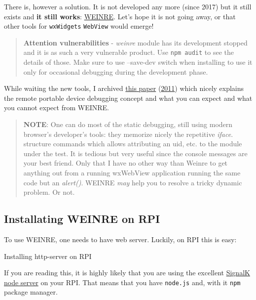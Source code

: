 \documentclass[11pt]{article}
\begin{document}
    There is, however a solution. It is not developed any more (since 2017)
but it still exists and \textbf{it still works}:
\href{https://people.apache.org/~pmuellr/weinre/docs/latest/}{WEINRE}.
Let's hope it is not going away, or that other tools for
\texttt{wxWidgets} \texttt{WebView} would emerge!

    \begin{quote}
\textbf{Attention vulnerabilities} - \emph{weinre} module has its
development stopped and it is as such a very vulnerable product. Use
\texttt{npm\ audit} to see the details of those. Make sure to use
--save-dev switch when installing to use it only for occasional
debugging during the development phase.
\end{quote}

    While waiting the new tools, I archived
\href{pdf/debugging_mobile_javascript_with_WEINRE_ibm_blog_2011.pdf}{this
paper}
(\href{https://www.ibm.com/developerworks/community/blogs/94e7fded-7162-445e-8ceb-97a2140866a9/entry/debugging_mobile_javascript_with_weinre?lang=en}{2011})
which nicely explains the remote portable device debugging concept and
what you can expect and what you cannot expect from WEINRE.

    \begin{quote}
\textbf{NOTE}: One can do most of the static debugging, still using
modern browser's developer's tools: they memorize nicely the repetitive
\emph{iface}. structure commands which allows attributing an uid, etc.
to the module under the test. It is tedious but very useful since the
console messages are your best friend. Only that I have no other way
than Weinre to get anything out from a running wxWebView application
running the same code but an \emph{alert()}. WEINRE \emph{may} help you
to resolve a tricky dynamic problem. Or not.
\end{quote}

    \hypertarget{installating-weinre-on-rpi}{%
\subsection{Installating WEINRE on
RPI}\label{installating-weinre-on-rpi}}

    To use WEINRE, one needs to have web server. Luckily, on RPI this is
easy:

    Installing http-server on RPI

    If you are reading this, it is highly likely that you are using the
excellent
\href{https://github.com/SignalK/signalk-server-node/blob/master/raspberry_pi_installation.md}{SignalK
node server} on your RPI. That means that you have \texttt{node.js} and,
with it \texttt{npm} package manager.
\end{document}
